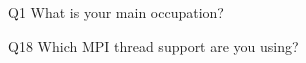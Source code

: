 \begin{description}%
\item{Q1} What is your main occupation?%
\item{Q18} Which MPI thread support are you using?%
\end{description}%

